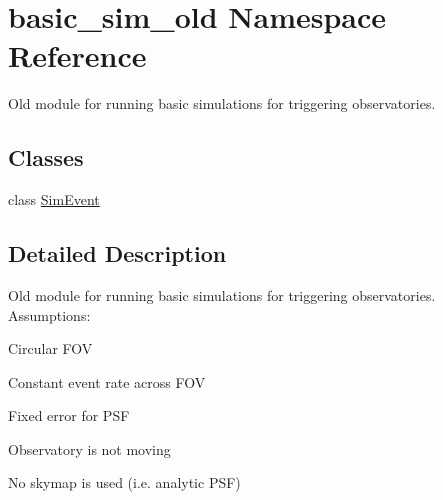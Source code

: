 \hypertarget{namespacebasic__sim__old}{\section{basic\-\_\-sim\-\_\-old Namespace Reference}
\label{namespacebasic__sim__old}
}


Old module for running basic simulations for triggering observatories.  


\subsection*{Classes}
\begin{DoxyCompactItemize}
\item 
class \hyperlink{classbasic__sim__old_1_1_sim_event}{Sim\-Event}
\end{DoxyCompactItemize}


\subsection{Detailed Description}
Old module for running basic simulations for triggering observatories. Assumptions\-:
\begin{DoxyEnumerate}
\item Circular F\-O\-V
\item Constant event rate across F\-O\-V
\item Fixed error for P\-S\-F
\item Observatory is not moving
\item No skymap is used (i.\-e. analytic P\-S\-F) 
\end{DoxyEnumerate}